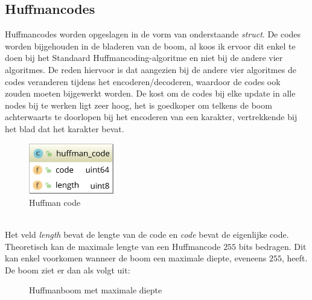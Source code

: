 \subsection{Huffmancodes}
Huffmancodes worden opgeslagen in de vorm van onderstaande \emph{struct}. De codes worden bijgehouden in de bladeren van de boom, al koos ik ervoor dit enkel te doen bij het Standaard Huffmancoding-algoritme en niet bij de andere vier algoritmes. De reden hiervoor is dat aangezien bij de andere vier algoritmes de codes veranderen tijdens het encoderen/decoderen, waardoor de codes ook zouden moeten bijgewerkt worden. De kost om de codes bij elke update in alle nodes bij te werken ligt zeer hoog, het is goedkoper om telkens de boom achterwaarts te doorlopen bij het encoderen van een karakter, vertrekkende bij het blad dat het karakter bevat.
\begin{figure}[h]
	\centering
	\includegraphics[width=10em]{resources/huffman-code.png}
	\caption{Huffman code}
\end{figure}
\\Het veld \emph{length} bevat de lengte van de code en \emph{code} bevat de eigenlijke code. Theoretisch kan de maximale lengte van een Huffmancode $255$ bits bedragen. Dit kan enkel voorkomen wanneer de boom een maximale diepte, eveneens $255$, heeft. De boom ziet er dan als volgt uit:
\newpage
\begin{figure}[h]
	\centering
{}
\caption{Huffmanboom met maximale diepte}
\end{figure}
